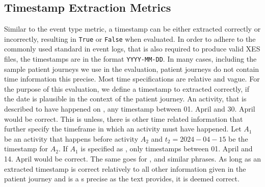 \subsection{Timestamp Extraction Metrics}\label{sec:time_metrics}
Similar to the event type metric, a timestamp can be either extracted correctly or incorrectly, resulting in \verb|True| or \verb|False| when evaluated. In order to adhere to the commonly used standard in event logs, that is also required to produce valid XES files, the timestamps are in the format \verb|YYYY-MM-DD|. In many cases, including the sample patient journeys we use in the evaluation, patient journeys do not contain time information this precise. Most time specifications are relative and vague. For the purpose of this evaluation, we define a timestamp to extracted correctly, if the date is plausible in the context of the patient journey. An activity, that is described to have happened on , any timestamp between 01. April and 30. April would be correct. This is unless, there is other time related information that further specify the timeframe in which an activity must have happened. Let $A_1$ be an activity that happens before activity $A_2$ and $t_2=2024-04-15$ be the timestamp for $A_2$. If $A_1$ is specified as , only timestamps between 01. April and 14. April would be correct. The same goes for ,  and similar phrases. As long as an extracted timestamp is correct relatively to all other information given in the patient journey and is a s precise as the text provides, it is deemed correct.
